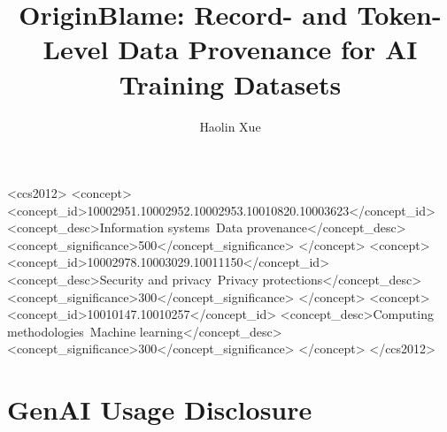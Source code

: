 \documentclass[sigconf]{acmart}
\begin{document}
\title{OriginBlame: Record- and Token-Level Data Provenance for AI Training Datasets}

\author{Haolin Xue}

\begin{CCSXML}
<ccs2012>
<concept>
<concept_id>10002951.10002952.10002953.10010820.10003623</concept_id>
<concept_desc>Information systems~Data provenance</concept_desc>
<concept_significance>500</concept_significance>
</concept>
<concept>
<concept_id>10002978.10003029.10011150</concept_id>
<concept_desc>Security and privacy~Privacy protections</concept_desc>
<concept_significance>300</concept_significance>
</concept>
<concept>
<concept_id>10010147.10010257</concept_id>
<concept_desc>Computing methodologies~Machine learning</concept_desc>
<concept_significance>300</concept_significance>
</concept>
</ccs2012>
\end{CCSXML}





\maketitle










\section*{GenAI Usage Disclosure}
\end{document}
